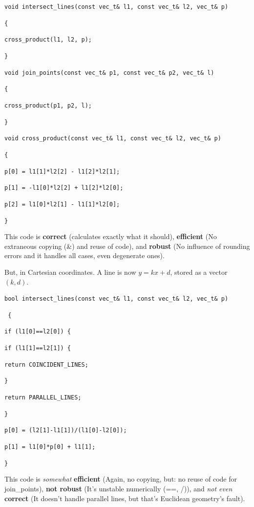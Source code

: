 \texttt{void intersect\_lines(const vec\_t\& l1, const vec\_t\& l2, vec\_t\& p)}

\texttt{\{}

\texttt{cross\_product(l1, l2, p);}

\texttt{\}}

\texttt{void join\_points(const vec\_t\& p1, const vec\_t\& p2, vec\_t\& l)}

\texttt{\{}

\texttt{cross\_product(p1, p2, l);}

\texttt{\}}

\texttt{void cross\_product(const vec\_t\& l1, const vec\_t\& l2, vec\_t\& p)}

\texttt{\{}

\texttt{p[0] = l1[1]*l2[2] - l1[2]*l2[1];}

\texttt{p[1] = -l1[0]*l2[2] + l1[2]*l2[0];}

\texttt{p[2] = l1[0]*l2[1] - l1[1]*l2[0];}

\texttt{\}}

This code is \textbf{correct} (calculates exactly what it should), \textbf{efficient} (No extraneous copying (\&) and reuse of code), and \textbf{robust} (No influence of rounding errors and it handles all cases, even degenerate ones).


But, in Cartesian coordinates. A line is now $y = kx + d$, stored as a vector $(k , d)$.

\texttt{bool intersect\_lines(const vec\_t\& l1, const vec\_t\& l2, vec\_t\& p)}

\texttt{ \{}

\texttt{if (l1[0]==l2[0]) \{}

\texttt{if (l1[1]==l2[1]) \{}

\texttt{return COINCIDENT\_LINES;}

\texttt{\}}

\texttt{return PARALLEL\_LINES;}

\texttt{\}}

\texttt{p[0] = (l2[1]-l1[1])/(l1[0]-l2[0]);}

\texttt{p[1] = l1[0]*p[0] + l1[1];}

\texttt{\}}

This code is \textit{somewhat} \textbf{efficient} (Again, no copying, but: no reuse of code for join\_points), \textbf{not robust} (It's unstable numerically (==, /)), and \textit{not even} \textbf{correct} (It doesn't handle parallel lines, but that's Euclidean geometry's fault).


